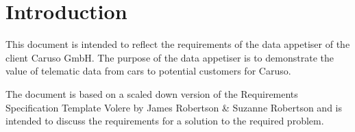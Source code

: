 \chapter{Introduction}
This document is intended to reflect the requirements of the data appetiser of the client Caruso GmbH. The purpose of the data appetiser is to demonstrate the value of telematic data from cars to potential customers for Caruso.

The document is based on a scaled down version of the Requirements Specification Template Volere by James Robertson \& Suzanne Robertson and is intended to discuss the requirements for a solution to the required problem.